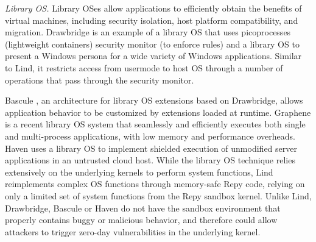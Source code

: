 \textit{Library OS.}
Library OSes allow applications to efficiently
obtain the benefits of virtual machines,
including security isolation, host platform compatibility, and
migration. 
%
Drawbridge \cite{Drawbridge-11} is an example of a library OS that uses picoprocesses
 (lightweight containers) security monitor (to enforce rules)
and a library OS to present a Windows persona for a wide variety of
Windows applications. Similar to Lind,
it restricts access from usermode to host OS through a number
of operations that pass through the security monitor.


Bascule \cite{Bascule}, an architecture for library OS extensions
based on Drawbridge, allows application behavior to be customized by
extensions loaded at runtime.
Graphene \cite{Graphene-14} is a recent library OS system that
seamlessly and efficiently executes both single and
multi-process applications, with low memory and performance overheads.
Haven \cite{Haven} uses a library OS to implement
shielded execution of unmodified server applications
in an untrusted cloud host.
While the library OS technique relies extensively on
the underlying kernels to perform system functions, 
Lind reimplements complex OS functions through memory-safe Repy 
code, relying on only a limited set of system functions from the Repy 
sandbox kernel. 
Unlike Lind, Drawbridge, Bascule 
or Haven do not have the sandbox environment that properly contains 
buggy or malicious behavior, and therefore could allow attackers 
to trigger zero-day vulnerabilities in the underlying kernel. 

